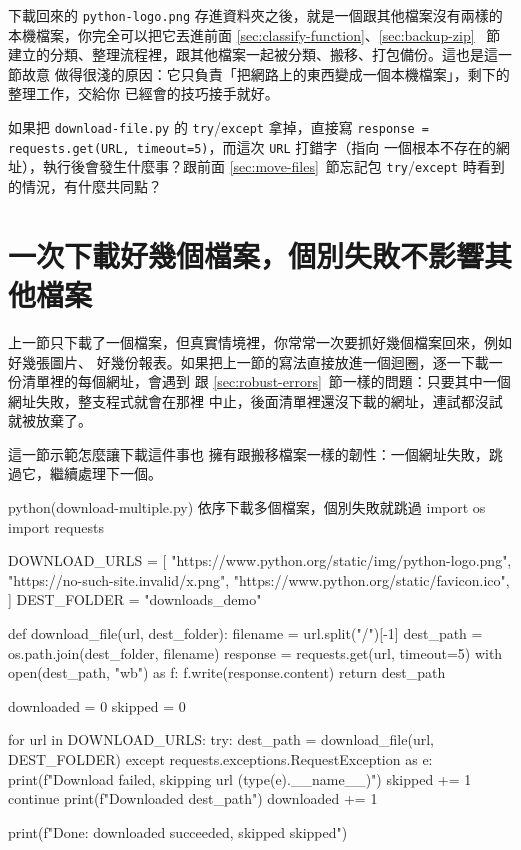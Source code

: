 
下載回來的 \texttt{python-logo.png} 存進資料夾之後，就是一個跟其他檔案沒有兩樣的
本機檔案，你完全可以把它丟進前面 \ref{sec:classify-function}、\ref{sec:backup-zip}~
節建立的分類、整理流程裡，跟其他檔案一起被分類、搬移、打包備份。這也是這一節故意
做得很淺的原因：它只負責「把網路上的東西變成一個本機檔案」，剩下的整理工作，交給你
已經會的技巧接手就好。

\begin{drills}[label=drills:requests-download]
\item 如果把 \texttt{download-file.py} 的 \texttt{try}/\texttt{except} 拿掉，直接寫
\texttt{response = requests.get(URL, timeout=5)}，而這次 \texttt{URL} 打錯字（指向
一個根本不存在的網址），執行後會發生什麼事？跟前面 \ref{sec:move-files}~節忘記包
\texttt{try}/\texttt{except} 時看到的情況，有什麼共同點？
\end{drills}

\section{一次下載好幾個檔案，個別失敗不影響其他檔案}
\label{sec:download-multiple}

上一節只下載了一個檔案，但真實情境裡，你常常一次要抓好幾個檔案回來，例如好幾張圖片、
好幾份報表。如果把上一節的寫法直接放進一個迴圈，逐一下載一份清單裡的每個網址，會遇到
跟 \ref{sec:robust-errors}~節一樣的問題：只要其中一個網址失敗，整支程式就會在那裡
中止，後面清單裡還沒下載的網址，連試都沒試就被放棄了。

這一節示範怎麼讓下載這件事也
擁有跟搬移檔案一樣的韌性：一個網址失敗，跳過它，繼續處理下一個。

\begin{example}{python}{(download-multiple.py) 依序下載多個檔案，個別失敗就跳過}
import os
import requests

DOWNLOAD_URLS = [
    "https://www.python.org/static/img/python-logo.png",
    "https://no-such-site.invalid/x.png",
    "https://www.python.org/static/favicon.ico",
]
DEST_FOLDER = "downloads_demo"


def download_file(url, dest_folder):
    filename = url.split("/")[-1]
    dest_path = os.path.join(dest_folder, filename)
    response = requests.get(url, timeout=5)
    with open(dest_path, "wb") as f:
        f.write(response.content)
    return dest_path


downloaded = 0
skipped = 0

for url in DOWNLOAD_URLS:
    try:
        dest_path = download_file(url, DEST_FOLDER)
    except requests.exceptions.RequestException as e:
        print(f"Download failed, skipping {url} ({type(e).__name__})")
        skipped += 1
        continue
    print(f"Downloaded {dest_path}")
    downloaded += 1

print(f"Done: {downloaded} succeeded, {skipped} skipped")
\end{example}

